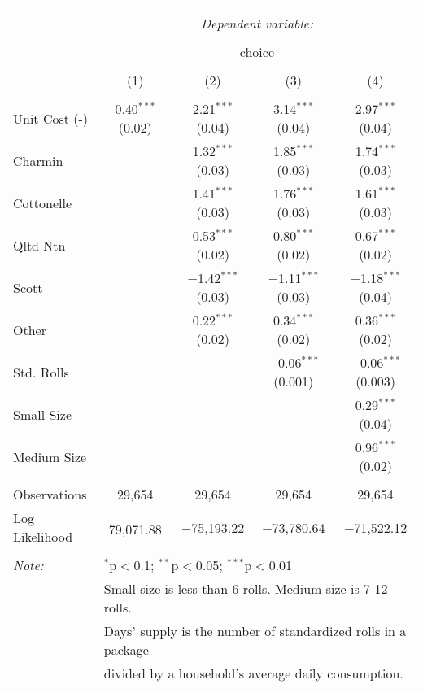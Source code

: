 
\begin{table}[!htbp] \centering 
  \caption{} 
  \label{tab:mnlPhoenixBaseline} 
\begin{tabular}{@{\extracolsep{5pt}}lcccc} 
\\[-1.8ex]\hline 
\hline \\[-1.8ex] 
 & \multicolumn{4}{c}{\textit{Dependent variable:}} \\ 
\cline{2-5} 
\\[-1.8ex] & \multicolumn{4}{c}{choice} \\ 
\\[-1.8ex] & (1) & (2) & (3) & (4)\\ 
\hline \\[-1.8ex] 
 Unit Cost (-) & 0.40$^{***}$ (0.02) & 2.21$^{***}$ (0.04) & 3.14$^{***}$ (0.04) & 2.97$^{***}$ (0.04) \\ 
  Charmin &  & 1.32$^{***}$ (0.03) & 1.85$^{***}$ (0.03) & 1.74$^{***}$ (0.03) \\ 
  Cottonelle &  & 1.41$^{***}$ (0.03) & 1.76$^{***}$ (0.03) & 1.61$^{***}$ (0.03) \\ 
  Qltd Ntn &  & 0.53$^{***}$ (0.02) & 0.80$^{***}$ (0.02) & 0.67$^{***}$ (0.02) \\ 
  Scott &  & $-$1.42$^{***}$ (0.03) & $-$1.11$^{***}$ (0.03) & $-$1.18$^{***}$ (0.04) \\ 
  Other &  & 0.22$^{***}$ (0.02) & 0.34$^{***}$ (0.02) & 0.36$^{***}$ (0.02) \\ 
  Std. Rolls &  &  & $-$0.06$^{***}$ (0.001) & $-$0.06$^{***}$ (0.003) \\ 
  Small Size &  &  &  & 0.29$^{***}$ (0.04) \\ 
  Medium Size &  &  &  & 0.96$^{***}$ (0.02) \\ 
 \hline \\[-1.8ex] 
Observations & 29,654 & 29,654 & 29,654 & 29,654 \\ 
Log Likelihood & $-$79,071.88 & $-$75,193.22 & $-$73,780.64 & $-$71,522.12 \\ 
\hline 
\hline \\[-1.8ex] 
\textit{Note:}  & \multicolumn{4}{l}{$^{*}$p$<$0.1; $^{**}$p$<$0.05; $^{***}$p$<$0.01} \\ 
 & \multicolumn{4}{l}{Small size is less than 6 rolls. Medium size is 7-12 rolls. } \\ 
 & \multicolumn{4}{l}{Days' supply is the number of standardized rolls in a package} \\ 
 & \multicolumn{4}{l}{divided by a household's average daily consumption.} \\ 
\end{tabular} 
\end{table} 
